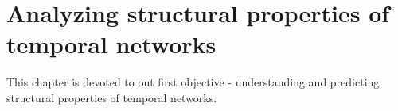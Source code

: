 
\chapter{Analyzing structural properties of temporal networks}
This chapter is devoted to out first objective - understanding and predicting structural properties of temporal networks.



%






 



 







% 


%



%


